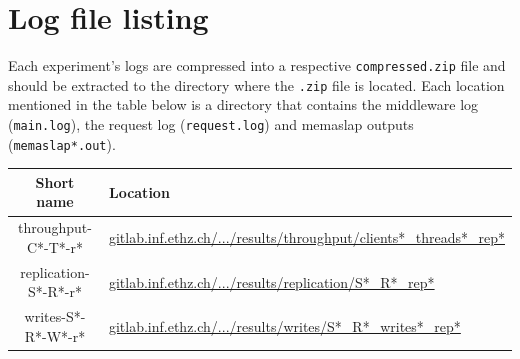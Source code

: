 \documentclass[11pt]{article}
\begin{document}
\clearpage

\section*{Log file listing}

Each experiment's logs are compressed into a respective \verb+compressed.zip+ file and should be extracted to the directory where the \verb+.zip+ file is located. Each location mentioned in the table below is a directory that contains the middleware log (\verb+main.log+), the request log (\verb+request.log+) and memaslap outputs (\verb+memaslap*.out+). \\

\begin{tabular}{|c|l|}
\hline \textbf{Short name}& \textbf{Location} \\ 
\hline throughput-C*-T*-r* & \href{https://gitlab.inf.ethz.ch/pungast/asl-fall16-project/blob/master/results/throughput}{gitlab.inf.ethz.ch/.../results/throughput/clients*\_threads*\_rep*} \\ 
\hline replication-S*-R*-r* & \href{https://gitlab.inf.ethz.ch/pungast/asl-fall16-project/blob/master/results/replication}{gitlab.inf.ethz.ch/.../results/replication/S*\_R*\_rep*} \\ 
\hline writes-S*-R*-W*-r* & \href{https://gitlab.inf.ethz.ch/pungast/asl-fall16-project/blob/master/results/writes}{gitlab.inf.ethz.ch/.../results/writes/S*\_R*\_writes*\_rep*} \\ 
\hline 
\end{tabular} 
 
\end{document}

